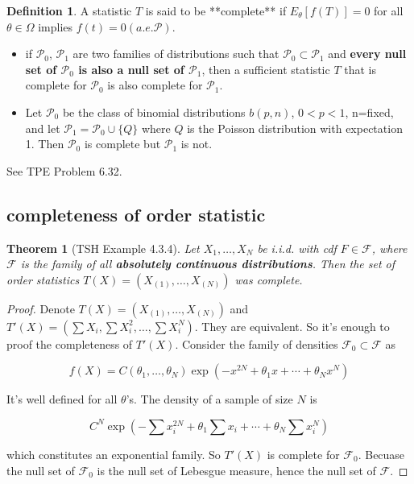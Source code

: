 \documentclass[11pt]{article}
\theoremstyle{plain}
\newtheorem{theorem}{\quad\quad Theorem}
\theoremstyle{definition}
\newtheorem{definition}{\quad\quad Definition}
\theoremstyle{remark}
\begin{document}
\begin{definition}
 A statistic \(T\) is said to be **complete** if \(E_\theta [f(T)]=0\) for all \(\theta\in \Omega\) implies \(f(t)=0(a.e.\mathcal{P})\).
\end{definition}

\begin{itemize}
    \item 
        if \(\mathcal{P}_0\), \(\mathcal{P}_1\) are two families of distributions such that \(\mathcal{P}_0\subset \mathcal{P}_1\) and \textbf{every null set of \(\mathcal{P}_0\) is also a null set of \(\mathcal{P}_1\)}, then a sufficient statistic \(T\) that is complete for \(\mathcal{P}_0\) is also complete for \(\mathcal{P}_1\).
    \item
 Let \(\mathcal{P}_0\) be the class of binomial distributions \(b(p,n)\), \(0<p<1\), n=fixed, and let \(\mathcal{P}_1=\mathcal{P}_0\cup \{Q\}\) where \(Q\) is the Poisson distribution with expectation 1. Then \(\mathcal{P}_0\) is complete but \(\mathcal{P}_1\) is not.
\end{itemize}
See TPE Problem 6.32.


\subsection{completeness of order statistic}

\begin{theorem}[TSH Example 4.3.4]
    Let \(X_1,\ldots,X_N\) be i.i.d. with cdf \(F\in\mathcal{F}\), where \(\mathcal{F}\) is the family of all \textbf{absolutely continuous distributions}.
    Then the set of order statistics \(T(X)=(X_{(1)},\ldots,X_{(N)})\) was complete.
\end{theorem}

\begin{proof}
    
 Denote \(T(X)=(X_{(1)},\ldots,X_{(N)})\) and \(T'(X)=(\sum X_i,\sum X_i^2,\ldots,\sum X_i^N)\). They are equivalent. So it's enough to proof the completeness of \(T'(X)\). Consider the family of densities \(\mathcal{F}_0\subset \mathcal{F}\) as

\[f(X)=C(\theta_1,\ldots,\theta_N) \exp (-x^{2N}+\theta_1 x +\cdots +\theta_N x^N)\]

It's well defined for all \(\theta\)'s. The density of a sample of size \(N\) is

\[C^N \exp (-\sum x_i^{2N}+\theta_1 \sum x_i +\cdots +\theta_N \sum x_i^N)\]

which constitutes an exponential family. So \(T'(X)\) is complete for \(\mathcal{F}_0\). Becuase the null set of \(\mathcal{F}_0\) is the null set of Lebesgue measure, hence the null set of \(\mathcal{F}\).
\end{proof}
\end{document}
